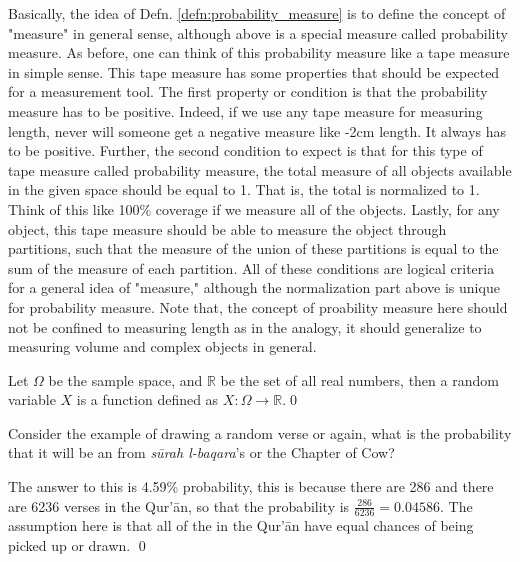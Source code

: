 Basically, the idea of Defn. \ref{defn:probability_measure} is to define the concept of "measure" in general sense, although above is a special measure called probability measure. As before, one can think of this probability measure like a tape measure in simple sense. This tape measure has some properties that should be expected for a measurement tool. The first property or condition is that the probability measure has to be positive. Indeed, if we use any tape measure for measuring length, never will someone get a negative measure like -2cm length. It always has to be positive. Further, the second condition to expect is that for this type of tape measure called probability measure, the total measure of all objects available in the given space should be equal to 1. That is, the total is normalized to 1. Think of this like 100\% coverage if we measure all of the objects. Lastly, for any object, this tape measure should be able to measure the object through partitions, such that the measure of the union of these partitions is equal to the sum of the measure of each partition. All of these conditions are logical criteria for a general idea of "measure," although the normalization part above is unique for probability measure. Note that, the concept of proability measure here should not be confined to measuring length as in the analogy, it should generalize to measuring volume and complex objects in general.
\begin{defnx}
Let $\Omega$ be the sample space, and $\mathbb{R}$ be the set of all real numbers, then a random variable $X$ is a function defined as $X:\Omega\rightarrow\mathbb{R}$.\qed
\end{defnx}
\begin{exmpx}\label{ex:ayah_prob}
Consider the example of drawing a random verse or   again, what is the probability that it will be an   from \textit{s\=urah l-baqara}'s   or the Chapter of Cow?

The answer to this is 4.59\% probability, this is because there are 286   and there are 6236 verses in the Qur'\=an, so that the probability is $\frac{286}{6236}=0.04586$. The assumption here is that all of the   in the Qur'\=an have equal chances of being picked up or drawn.
\qed
\end{exmpx}

